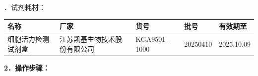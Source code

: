 \documentclass[UTF8,10pt,a4paper,fontset=fandol]{ctexart}
\newcommand{\fieldvalue}[1]{#1}
\newcommand{\handwritten}[1]{#1}
\begin{document}
．试剂耗材：

\begin{center}
\begin{tabularx}{\textwidth}{|X|X|X|X|X|}
\hline
名称 & 厂家 & 货号 & 批号 & 有效期至\\
\hline
\fieldvalue{细胞活力检测试剂盒} &
\fieldvalue{江苏凯基生物技术股份有限公司} &
\fieldvalue{KGA9501-1000} &
\fieldvalue{\handwritten{20250410}} &
\fieldvalue{\handwritten{2025.10.09}}\\
\hline
\end{tabularx}
\end{center}

\noindent\textbf{2．操作步骤：}
\end{document}
